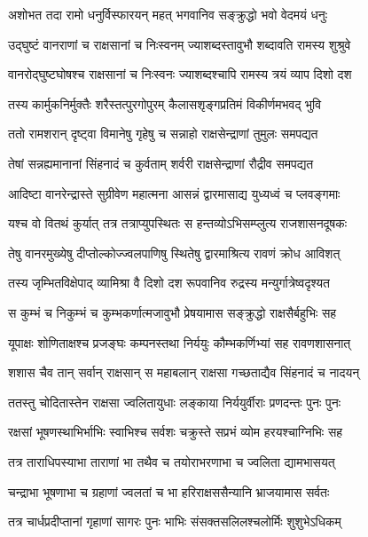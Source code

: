 \twolineshloka
{अशोभत तदा रामो धनुर्विस्फारयन् महत्}
{भगवानिव सङ्क्रुद्धो भवो वेदमयं धनुः} %

\twolineshloka
{उद्घुष्टं वानराणां च राक्षसानां च निःस्वनम्}
{ज्याशब्दस्तावुभौ शब्दावति रामस्य शुश्रुवे} %

\twolineshloka
{वानरोद्घुष्टघोषश्च राक्षसानां च निःस्वनः}
{ज्याशब्दश्चापि रामस्य त्रयं व्याप दिशो दश} %

\twolineshloka
{तस्य कार्मुकनिर्मुक्तैः शरैस्तत्पुरगोपुरम्}
{कैलासशृङ्गप्रतिमं विकीर्णमभवद् भुवि} %

\twolineshloka
{ततो रामशरान् दृष्ट्वा विमानेषु गृहेषु च}
{सन्नाहो राक्षसेन्द्राणां तुमुलः समपद्यत} %

\twolineshloka
{तेषां सन्नह्यमानानां सिंहनादं च कुर्वताम्}
{शर्वरी राक्षसेन्द्राणां रौद्रीव समपद्यत} %

\twolineshloka
{आदिष्टा वानरेन्द्रास्ते सुग्रीवेण महात्मना}
{आसन्नं द्वारमासाद्य युध्यध्वं च प्लवङ्गमाः} %

\twolineshloka
{यश्च वो वितथं कुर्यात् तत्र तत्राप्युपस्थितः}
{स हन्तव्योऽभिसम्प्लुत्य राजशासनदूषकः} %

\twolineshloka
{तेषु वानरमुख्येषु दीप्तोल्कोज्ज्वलपाणिषु}
{स्थितेषु द्वारमाश्रित्य रावणं क्रोध आविशत्} %

\twolineshloka
{तस्य जृम्भितविक्षेपाद् व्यामिश्रा वै दिशो दश}
{रूपवानिव रुद्रस्य मन्युर्गात्रेष्वदृश्यत} %

\twolineshloka
{स कुम्भं च निकुम्भं च कुम्भकर्णात्मजावुभौ}
{प्रेषयामास सङ्क्रुद्धो राक्षसैर्बहुभिः सह} %

\twolineshloka
{यूपाक्षः शोणिताक्षश्च प्रजङ्घः कम्पनस्तथा}
{निर्ययुः कौम्भकर्णिभ्यां सह रावणशासनात्} %

\twolineshloka
{शशास चैव तान् सर्वान् राक्षसान् स महाबलान्}
{राक्षसा गच्छताद्यैव सिंहनादं च नादयन्} %

\twolineshloka
{ततस्तु चोदितास्तेन राक्षसा ज्वलितायुधाः}
{लङ्काया निर्ययुर्वीराः प्रणदन्तः पुनः पुनः} %

\twolineshloka
{रक्षसां भूषणस्थाभिर्भाभिः स्वाभिश्च सर्वशः}
{चक्रुस्ते सप्रभं व्योम हरयश्चाग्निभिः सह} %

\twolineshloka
{तत्र ताराधिपस्याभा ताराणां भा तथैव च}
{तयोराभरणाभा च ज्वलिता द्यामभासयत्} %

\twolineshloka
{चन्द्राभा भूषणाभा च ग्रहाणां ज्वलतां च भा}
{हरिराक्षससैन्यानि भ्राजयामास सर्वतः} %

\twolineshloka
{तत्र चार्धप्रदीप्तानां गृहाणां सागरः पुनः}
{भाभिः संसक्तसलिलश्चलोर्मिः शुशुभेऽधिकम्} %

